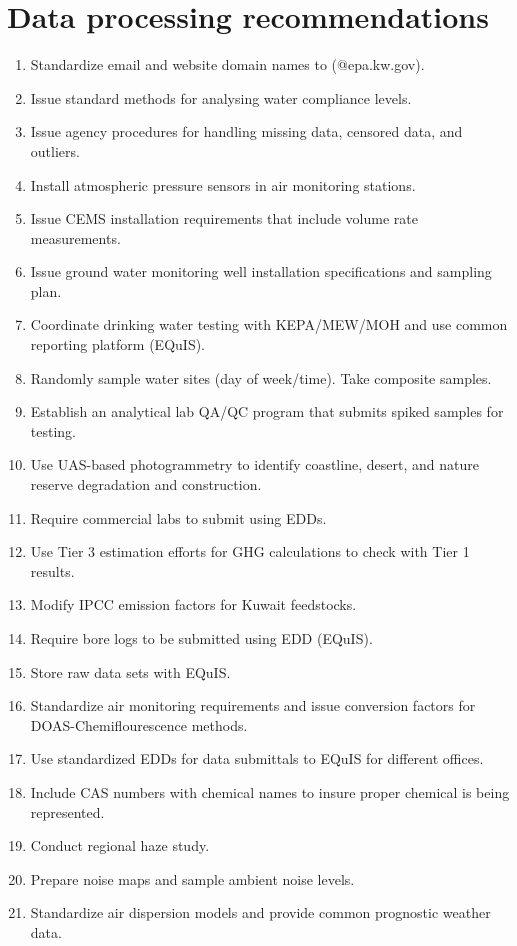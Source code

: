 \section{Data processing recommendations}
\begin{enumerate}
\item Standardize email and website domain names to (@epa.kw.gov). 
\item Issue standard methods for analysing water compliance levels.
\item Issue agency procedures for handling missing data, censored data, and outliers.
\item Install atmospheric pressure sensors in air monitoring stations.
\item Issue CEMS installation requirements that include volume rate measurements.
\item Issue ground water monitoring well installation specifications and sampling plan.
\item Coordinate drinking water testing with KEPA/MEW/MOH and use common reporting platform (EQuIS).
\item Randomly sample water sites (day of week/time). Take composite samples.
\item Establish an analytical lab QA/QC program that submits spiked samples for testing.
\item Use UAS-based photogrammetry to identify coastline, desert, and nature reserve degradation and construction.
\item Require commercial labs to submit using EDDs.
\item Use Tier 3 estimation efforts for GHG calculations to check with Tier 1 results.
\item Modify IPCC emission factors for Kuwait feedstocks.
\item Require bore logs to be submitted using EDD (EQuIS).
\item Store raw data sets with EQuIS.
\item Standardize air monitoring requirements and issue conversion factors for DOAS-Chemiflourescence methods.
\item Use standardized EDDs for data submittals to EQuIS for different offices.
\item Include CAS numbers with chemical names to insure proper chemical is being represented.
\item Conduct regional haze study.
\item Prepare noise maps and sample ambient noise levels.
\item Standardize air dispersion models and provide common prognostic weather data.
\end{enumerate}

